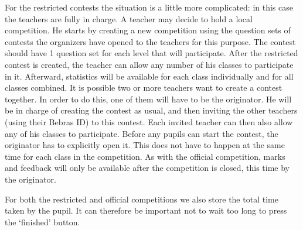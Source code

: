 For the restricted contests the situation is a little more complicated: in this case the teachers are fully 
in charge. A teacher may decide to hold a local competition. He starts by creating a new competition using 
the question sets of contests the organizers have opened to the teachers for this purpose. The contest 
should have 1 question set for each level that will participate. After the restricted contest is created, 
the teacher can allow any number of his classes to participate in it. Afterward, statistics will be 
available for each class individually and for all classes combined. It is possible two or more teachers 
want to create a contest together. In order to do this, one of them will have to be the originator. He will 
be in charge of creating the contest as usual, and then inviting the other teachers (using their Bebras ID) 
to this contest. Each invited teacher can then also allow any of his classes to participate. Before any 
pupils can start the contest, the originator has to explicitly open it. This does not have to happen at the 
same time for each class in the competition. As with the official competition, marks and feedback will only 
be available after the competition is closed, this time by the originator.

For both the restricted and official competitions we also store the total time taken by the pupil. It can 
therefore be important not to wait too long to press the `finished' button.     
